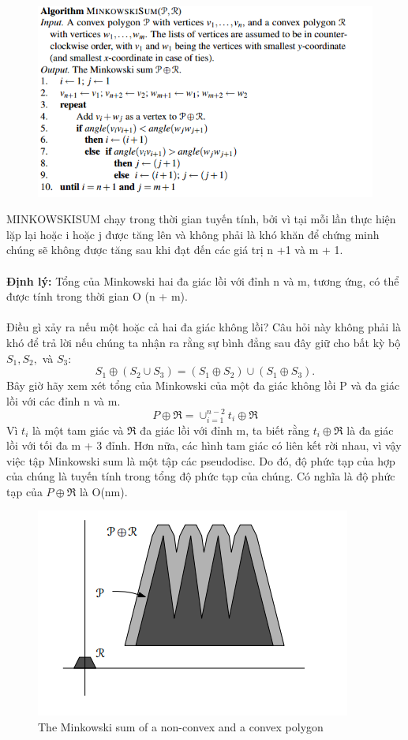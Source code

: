\documentclass[a4paper,12pt]{report}
\begin{document}
\begin{figure}[H]
\includegraphics[width=0.85\linewidth]{ag1.png}
\end{figure}
MINKOWSKISUM chạy trong thời gian tuyến tính, bởi vì tại mỗi lần thực hiện lặp lại hoặc i hoặc j được tăng lên và không phải là khó khăn để chứng minh chúng sẽ không được tăng sau khi đạt đến các giá trị n +1 và m + 1.  \\ \\
\textbf{Định lý:} Tổng của Minkowski hai đa giác lồi với đỉnh n và m, tương ứng, có thể được tính trong thời gian O (n + m). \\ \\
Điều gì xảy ra nếu một hoặc cả hai đa giác không lồi? Câu hỏi này không phải là khó để trả lời nếu chúng ta nhận ra rằng sự bình đẳng sau đây giữ cho bất kỳ bộ $S_1, S_2,$ và $S_3$:
\begin{displaymath}
S_1 \oplus (S_2 \cup S_3) = (S_1 \oplus S_2) \cup (S_1 \oplus S_3).
\end{displaymath}
Bây giờ hãy xem xét tổng của Minkowski của một đa giác không lồi P và đa giác lồi với các đỉnh n và m.
\begin{displaymath}
P \oplus \Re = \cup_{i = 1}^{n-2}t_i \oplus \Re
\end{displaymath}
Vì $t_i$ là một tam giác và $\Re$ đa giác lồi với đỉnh m, ta biết rằng $t_i \oplus \Re$ là đa giác lồi với tối đa m + 3 đỉnh. Hơn nữa, các hình tam giác có liên kết rời nhau, vì vậy việc tập Minkowski sum là một tập các pseudodisc. Do đó, độ phức tạp của  hợp của chúng là tuyến tính trong tổng độ phức tạp của chúng. Có nghĩa là độ phức tạp của $P \oplus \Re$ là O(nm). \\
\begin{figure}[H]
\centering
\includegraphics[width=0.6\linewidth]{10.png}
\caption{The Minkowski sum of a non-convex
and a convex polygon}
\end{figure}
\end{document}
